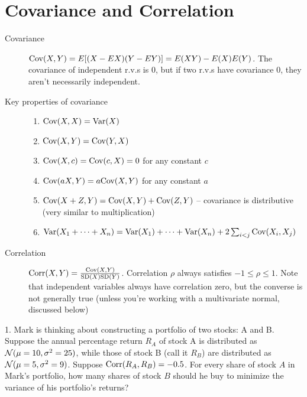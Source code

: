 \documentclass{article}
\begin{document}
 

\header

\section{Covariance and Correlation}

\begin{description}

\item[Covariance] $\textrm{Cov}(X, Y) = E[(X - EX)(Y - EY)] = E(XY) - E(X)E(Y)$. The covariance of independent r.v.s is 0, but if two r.v.s have covariance 0, they aren't necessarily independent.

\item[Key properties of covariance]

    \begin{enumerate}
        \item $\textrm{Cov}(X, X) = \textrm{Var}(X)$
        
        \item $\textrm{Cov}(X, Y) = \textrm{Cov}(Y, X)$
        
        \item $\textrm{Cov}(X, c) = \textrm{Cov}(c, X) = 0$ for any constant $c$
        
        \item $\textrm{Cov}(aX, Y) = a\textrm{Cov}(X, Y)$ for any constant $a$
        
        \item $\textrm{Cov}(X + Z, Y) = \textrm{Cov}(X, Y) + \textrm{Cov}(Z, Y)$ -- covariance is distributive (very similar to multiplication)
        
        \item $\textrm{Var}(X_1 + \dots + X_n) = \textrm{Var}(X_1) + \dots + \textrm{Var}(X_n) + 2\sum_{i < j} \textrm{Cov}(X_i, X_j)$
    \end{enumerate}

\item[Correlation] $\textrm{Corr}(X, Y) = \frac{\textrm{Cov}(X, Y)}{\textrm{SD}(X)\textrm{SD}(Y)}$. Correlation $\rho$ always satisfies $-1 \leq \rho \leq 1$. Note that independent variables always have correlation zero, but the converse is not generally true (unless you're working with a multivariate normal, discussed below)

\end{description}

1. Mark is thinking about constructing a portfolio of two stocks: A and B. Suppose the annual percentage return $R_A$ of stock A is distributed as $\mathcal{N}(\mu=10, \sigma^2=25)$, while those of stock B (call it $R_B$) are distributed as $\mathcal{N}(\mu=5, \sigma^2=9)$. Suppose $\textrm{Corr}(R_A,R_B) = -0.5$. For every share of stock $A$ in Mark's portfolio, how many shares of stock $B$ should he buy to minimize the variance of his portfolio's returns?
\end{document}
